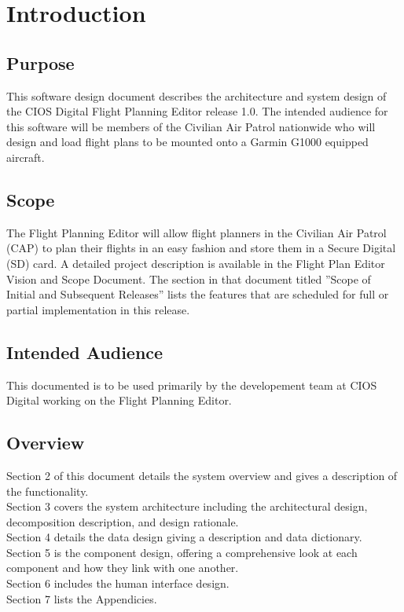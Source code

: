 \documentclass[12pt, letterpaper]{article}
\begin{document}
\newpage


\section{Introduction}
  \subsection{Purpose}
    This software design document describes the architecture and system design of the CIOS Digital Flight Planning Editor release 1.0.
    The intended audience for this software will be members of the Civilian Air Patrol nationwide who will design and load flight plans to be mounted onto a Garmin G1000 equipped aircraft.

\subsection{Scope}
  The Flight Planning Editor will allow flight planners in the Civilian Air Patrol (CAP) to plan their flights in an easy fashion and store them in a Secure Digital (SD) card. A detailed project description is available in the Flight Plan Editor Vision and Scope Document. The section in that document titled ”Scope of Initial and Subsequent Releases” lists the features that are scheduled for full or partial implementation in this release.

  \subsection{Intended Audience}
This documented is to be used primarily by the developement team at CIOS Digital working on the Flight Planning Editor.

  \subsection{Overview}
Section 2 of this document details the system overview and gives a description of the functionality. \\
Section 3 covers the system architecture including the architectural design, decomposition description, and design rationale. \\
Section 4 details the data design giving a description and data dictionary. \\
Section 5 is the component design, offering a comprehensive look at each component and how they link with one another. \\
Section 6 includes the human interface design. \\
Section 7 lists the Appendicies. \\
\end{document}
